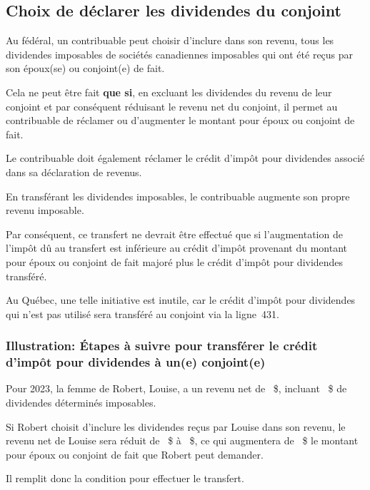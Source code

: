 \subsection{Choix de déclarer les dividendes du conjoint}
\ca
Au fédéral, un contribuable peut choisir d'inclure dans son revenu, tous les dividendes imposables de sociétés canadiennes imposables qui ont été reçus par son époux(se) ou conjoint(e) de fait.

Cela ne peut être fait \textbf{que si}, en excluant les dividendes du revenu de leur conjoint  et par conséquent réduisant le revenu net du conjoint, il permet au contribuable de réclamer ou d'augmenter le montant pour époux ou conjoint de fait.

Le contribuable doit également réclamer le crédit d'impôt pour dividendes associé dans sa déclaration de revenus.

En transférant les dividendes imposables, le contribuable augmente son propre revenu imposable.

Par conséquent, ce transfert ne devrait être effectué que si l'augmentation de l'impôt dû au transfert est inférieure au crédit d'impôt provenant du montant pour époux ou conjoint de fait majoré plus le crédit d'impôt pour dividendes transféré.

\qc
Au Québec, une telle initiative est inutile, car le crédit d'impôt pour dividendes qui n'est pas utilisé sera transféré au conjoint via la ligne~431.

\subsubsection{Illustration: Étapes à suivre pour transférer le crédit d'impôt pour dividendes à un(e) conjoint(e)}
Pour 2023, la femme de Robert, Louise, a un revenu net de ~\$, incluant ~\$ de dividendes déterminés imposables.

Si Robert choisit d'inclure les dividendes reçus par Louise dans son revenu, le revenu net de Louise sera réduit de ~\$ à ~\$, ce qui augmentera de ~\$ le montant pour époux ou conjoint de fait que Robert peut demander.

Il remplit donc la condition pour effectuer le transfert.

